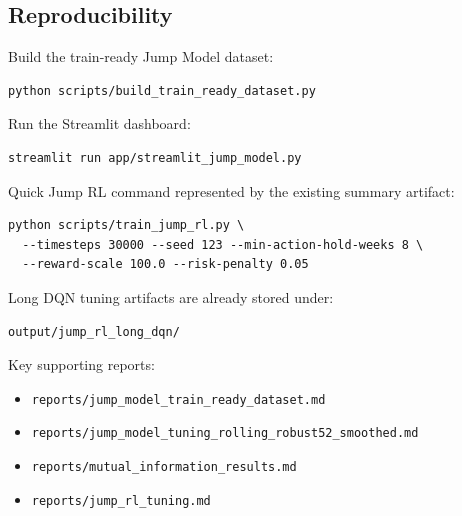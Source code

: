 \subsection{Reproducibility}\label{reproducibility}

Build the train-ready Jump Model dataset:

\begin{verbatim}
python scripts/build_train_ready_dataset.py
\end{verbatim}

Run the Streamlit dashboard:

\begin{verbatim}
streamlit run app/streamlit_jump_model.py
\end{verbatim}

Quick Jump RL command represented by the existing summary artifact:

\begin{verbatim}
python scripts/train_jump_rl.py \
  --timesteps 30000 --seed 123 --min-action-hold-weeks 8 \
  --reward-scale 100.0 --risk-penalty 0.05
\end{verbatim}

Long DQN tuning artifacts are already stored under:

\begin{verbatim}
output/jump_rl_long_dqn/
\end{verbatim}

Key supporting reports:

\begin{itemize}
\tightlist
\item
  \texttt{reports/jump\_model\_train\_ready\_dataset.md}
\item
  \texttt{reports/jump\_model\_tuning\_rolling\_robust52\_smoothed.md}
\item
  \texttt{reports/mutual\_information\_results.md}
\item
  \texttt{reports/jump\_rl\_tuning.md}
\end{itemize}
